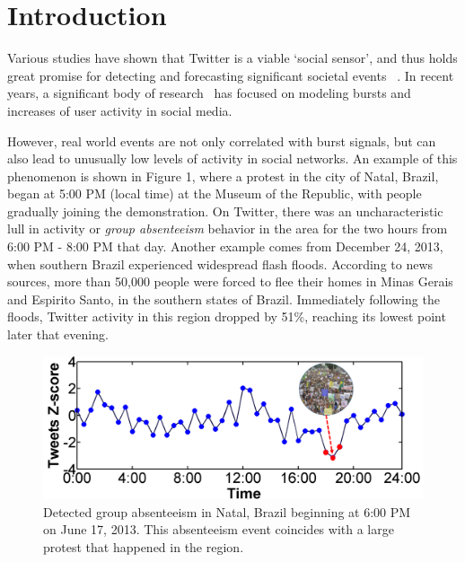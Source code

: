 \section{Introduction} \label{sec:intro}
Various studies have shown that Twitter is a viable `social sensor', and thus holds great promise for detecting and forecasting significant societal events ~\cite{bugel2013multilingual,sakaki2010earthquake}.
In recent years, a significant body of research~\cite{aggarwal2012event,hong2012discovering,lappas2009burstiness,lappas2012spatiotemporal,sakaki2010earthquake,sayyadi2009event,watanabe2011jasmine,weng2011event,yin2011geographical} has focused on modeling bursts and increases of user activity in social media.

However, real world events are not only correlated with burst signals, but can also lead to unusually low levels of activity in social networks. An example of this phenomenon
is shown in Figure 1, where a protest in the city of Natal, Brazil, began at 5:00 PM (local time) at the Museum of the Republic, with people gradually joining the demonstration. %
On Twitter, there was an uncharacteristic lull in activity or {\it group absenteeism} behavior in the area for the two hours from 6:00 PM - 8:00 PM that day. Another example comes from December 24, 2013, when southern Brazil experienced widespread flash floods. According to news sources, more than 50,000 people were forced to flee their homes in Minas Gerais and Espirito Santo, in the southern states of Brazil. Immediately following the floods, Twitter activity in this region dropped by 51\%, reaching its lowest point later that evening.



\begin{figure}[t]
\centering
\includegraphics[width=4.5in]{figures/Natal_example1.png}
\caption{Detected group absenteeism in Natal, Brazil beginning at 6:00 PM on June 17, 2013. This absenteeism event coincides with a large protest that happened in the region.}
\label{fig:natal-protest}
\end{figure}


